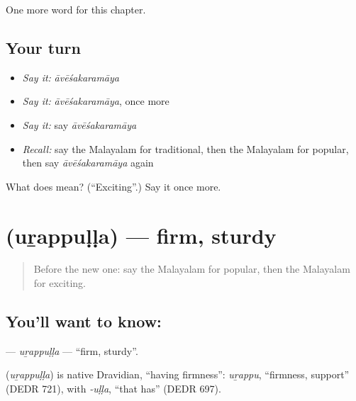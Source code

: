 \begin{grammarlens}[title={What you've built}]
One more word for this chapter.
\end{grammarlens}

\subsection*{Your turn}
\begin{itemize}
\raggedright
  \item \emph{Say it:} \emph{āvēśakaramāya}
  \item \emph{Say it:} \emph{āvēśakaramāya}, once more
  \item \emph{Say it:} say \emph{āvēśakaramāya}
  \item \emph{Recall:} say the Malayalam for traditional, then the Malayalam for popular, then say \emph{āvēśakaramāya} again
\end{itemize}

\begin{tcolorbox}[breakable,colback=teal!4,colframe=teal!35!black,title={Before you move on}]
What does  mean? (\textquotedblleft{}Exciting\textquotedblright{}.) Say it once more.
\end{tcolorbox}
\section[\texorpdfstring{\ml{ഉറപ്പുള്ള} (uṟappuḷḷa)}{ഉറപ്പുള്ള (uṟappuḷḷa)}]{ (uṟappuḷḷa) — firm, sturdy}

\label{lesson:ML-C246-urappulla}



\begin{quote}
Before the new one: say the Malayalam for popular, then the Malayalam for exciting.
\end{quote}

\subsection*{You'll want to know: }
\textbf{} — \emph{uṟappuḷḷa} — \textquotedblleft{}firm, sturdy\textquotedblright{}.

\begin{cousinweb}
\textbf{} (\emph{uṟappuḷḷa}) is native Dravidian, \textquotedblleft{}having firmness\textquotedblright{}: \emph{uṟappu}, \textquotedblleft{}firmness, support\textquotedblright{} (DEDR 721), with \emph{-uḷḷa}, \textquotedblleft{}that has\textquotedblright{} (DEDR 697).
\end{cousinweb}

